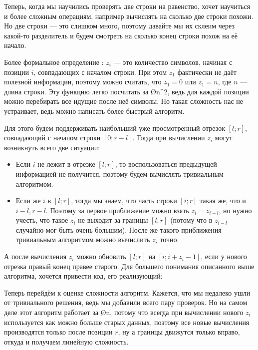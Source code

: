 Теперь, когда мы научились проверять две строки на равенство, хочет научиться и более сложным операциям, например вычислять на сколько две строки похожи. Но две строки — это слишком много, поэтому давайте мы их склеим через какой-то разделитель и будем смотреть на сколько конец строки похож на её начало.

Более формальное определение : $z_i$ — это количество символов, начиная с позиции $i$, совпадающих с началом строки. При этом $z_1$ фактически не даёт полезной информации, поэтому можно считать, что $z_1 = 0$ или $z_1 = n$, где $n$ — длина строки. Эту функцию легко посчитать за \O{n^2}, ведь для каждой позиции можно перебирать все идущие после неё символы. Но такая сложность нас не устраивает, ведь можно написать более быстрый алгоритм.

Для этого будем поддерживать наибольший уже просмотренный отрезок $[l; r]$, совпадающий с началом строки $[0; r - l]$. Тогда при вычислении $z_i$ могут возникнуть всего две ситуации:

\begin{itemize}
    \item Если $i$ не лежит в отрезке $[l; r]$, то воспользоваться предыдущей информацией не получится, поэтому будем вычислять тривиальным алгоритмом.
    \item Если же $i$ в $[l; r]$, тогда мы знаем, что часть строки $[i; r]$ такая же, что и $i - l, r - l$. Поэтому за первое приближение можно взять $z_i = z_{i - l}$, но нужно учесть, что такое $z_i$ не выходит за границы $[l; r]$ (потому что в $z_{i - l}$ случайно мог быть очень большим). После же такого приближения тривиальным алгоритмом можно вычислить $z_i$ точно. 
\end{itemize}

А после вычисления $z_i$ можно обновить $[l; r]$ на $[i; i + z_i - 1]$, если у нового отрезка правый конец правее старого. Для большего понимания описанного выше алгоритма, хочется привести код, его реализующий:


Теперь перейдём к оценке сложности алгоритм. Кажется, что мы недалеко ушли от тривиального решения, ведь мы добавили всего пару проверок. Но на самом деле этот алгоритм работает за \O{n}, потому что всегда при вычислении нового $z_i$ используется как можно больше старых данных, поэтому все новые вычисления производятся только после позиции $r$, ну а границы движутся только вправо, откуда и получаем линейную сложность.

